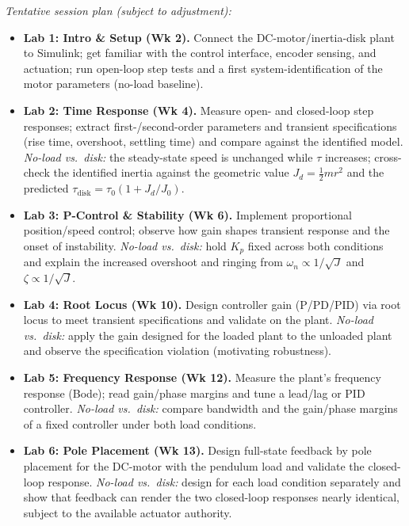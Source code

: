 \documentclass[11pt]{article}
\begin{document}
\emph{Tentative session plan (subject to adjustment):}
\begin{itemize}
    \item \textbf{Lab 1: Intro \& Setup (Wk 2).} Connect the DC-motor/inertia-disk
          plant to Simulink; get familiar with the control interface, encoder sensing,
          and actuation; run open-loop step tests and a first system-identification of
          the motor parameters (no-load baseline).
    \item \textbf{Lab 2: Time Response (Wk 4).} Measure open- and closed-loop step
          responses; extract first-/second-order parameters and transient specifications
          (rise time, overshoot, settling time) and compare against the identified model.
          \emph{No-load vs.\ disk:} the steady-state speed is unchanged while $\tau$
          increases; cross-check the identified inertia against the geometric value
          $J_d = \frac{1}{2}mr^2$ and the predicted
          $\tau_{\mathrm{disk}} = \tau_0(1 + J_d/J_0)$.
    \item \textbf{Lab 3: P-Control \& Stability (Wk 6).} Implement proportional
          position/speed control; observe how gain shapes transient response and the
          onset of instability. \emph{No-load vs.\ disk:} hold $K_p$ fixed across both
          conditions and explain the increased overshoot and ringing from
          $\omega_n \propto 1/\sqrt{J}$ and $\zeta \propto 1/\sqrt{J}$.
    \item \textbf{Lab 4: Root Locus (Wk 10).} Design controller gain (P/PD/PID) via
          root locus to meet transient specifications and validate on the plant.
          \emph{No-load vs.\ disk:} apply the gain designed for the loaded plant to the
          unloaded plant and observe the specification violation (motivating robustness).
    \item \textbf{Lab 5: Frequency Response (Wk 12).} Measure the plant's frequency
          response (Bode); read gain/phase margins and tune a lead/lag or PID controller.
          \emph{No-load vs.\ disk:} compare bandwidth and the gain/phase margins of a
          fixed controller under both load conditions.
    \item \textbf{Lab 6: Pole Placement (Wk 13).} Design full-state feedback by pole
          placement for the DC-motor with the pendulum load and validate the closed-loop
          response. \emph{No-load vs.\ disk:} design for each load condition separately
          and show that feedback can render the two closed-loop responses nearly
          identical, subject to the available actuator authority.
\end{itemize}
\end{document}

